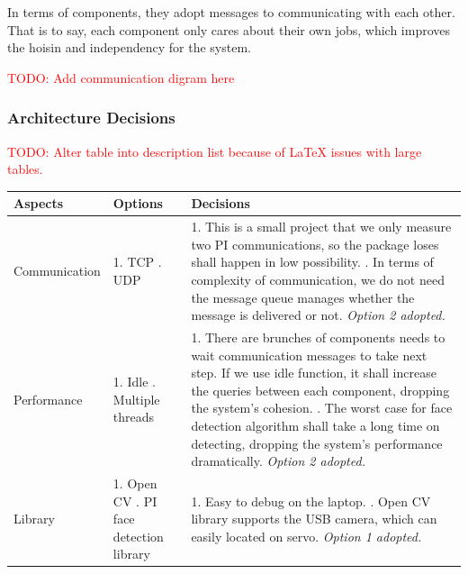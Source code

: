\documentclass[11pt,a4paper,titlepage]{report}
\begin{document}
In terms of components, they adopt messages to communicating with each other. That is to say, each component only cares about their own jobs, which improves the hoisin and independency for the system.

\textcolor{red}{TODO: Add communication digram here}


\subsubsection{Architecture Decisions}

\textcolor{red}{TODO: Alter table into description list because of LaTeX issues with large tables.}


\begin{center}
\begin{table}
\begin{tabular}{|p{}|p{}|p{}|}
    \hline
    \textbf{Aspects} & \textbf{Options} & \textbf{Decisions} \\ \hline
    
     Communication & 1. TCP \newline 2. UDP & 1. This is a small project that we only measure two PI communications, so the package loses shall happen in low possibility. \newline  2. In terms of complexity of communication, we do not need the message queue manages whether the message is delivered or not. \newline \textit{Option 2 adopted.
} \\ \hline

     Performance & 1. Idle \newline 2. Multiple threads & 1. There are brunches of components needs to wait communication messages to take next step. If we use idle function, it shall increase the queries between each component, dropping the system's cohesion. \newline  2. The worst case for face detection algorithm shall take a long time on detecting, dropping the system’s performance dramatically. \newline \textit{Option 2 adopted.
} \\ \hline

     Library & 1. Open CV \newline 2. PI face detection library & 1. Easy to debug on the laptop. \newline  2. Open CV library supports the USB camera, which can easily located on servo. \newline \textit{Option 1 adopted.
} \\ \hline
     

\end{tabular}
\end{table}
\end{center}
\end{document}
